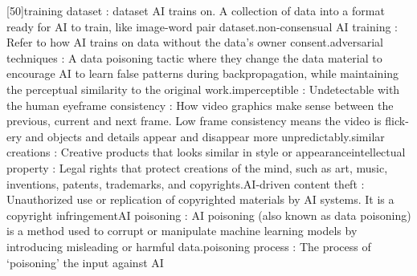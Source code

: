 [50]training dataset : dataset AI trains on. A collection of data into a format ready for AI to train, like image-word pair dataset.\newline
[51]non-consensual AI training : Refer to how AI trains on data without the data’s owner consent.\newline
[52]adversarial techniques : A data poisoning tactic where they change the data material to encourage AI to learn false patterns during backpropagation, while maintaining the perceptual similarity to the original work.\newline
[53]imperceptible : Undetectable with the human eye\newline
[54]frame consistency : How video graphics make sense between the previous, current and next frame. Low frame consistency means the video is flick-ery and objects and details appear and disappear more unpredictably.\newline
[55]similar creations : Creative products that looks similar in style or appearance\newline
[56]intellectual property : Legal rights that protect creations of the mind, such as art, music, inventions, patents, trademarks, and copyrights.\newline
[57]AI-driven content theft : Unauthorized use or replication of copyrighted materials by AI systems. It is a copyright infringement\newline
[58]AI poisoning : AI poisoning (also known as data poisoning) is a method used to corrupt or manipulate machine learning models by introducing misleading or harmful data.\newline
[59]poisoning process : The process of ‘poisoning’ the input against AI\newline
